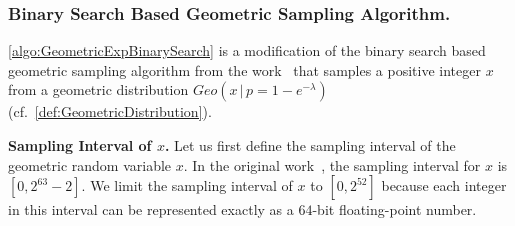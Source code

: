 
\subsubsection{Binary Search Based Geometric Sampling Algorithm.}
\label{subsubsec:BinarySearchBasedGeometricSamplingAlgorithm}

\autoref{algo:GeometricExpBinarySearch} is a modification of the binary search based geometric sampling algorithm from the work~\cite{googleDP2019GitHub} that samples a positive integer $x$ from a geometric distribution $Geo\left(x\,|\,p=1-e^{-\lambda}\right)$ (cf.~\autoref{def:GeometricDistribution}).

\textbf{Sampling Interval of $x$.}
Let us first define the sampling interval of the geometric random variable $x$.
In the original work~\cite{googleDP2019GitHub}, the sampling interval for $x$ is $ \left[0, 2^{63}-2\right]$. We limit the sampling interval of $x$ to $\left[0, 2^{52}\right]$ because each integer in this interval can be represented exactly as a $64$-bit floating-point number.






